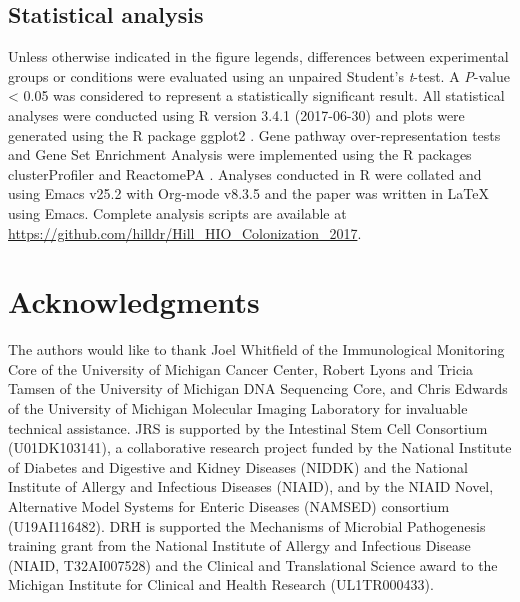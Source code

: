 \documentclass[9pt,lineo]{elife}
\begin{document}
\subsection*{{\bfseries\sffamily } Statistical analysis}
\label{sec:orgheadline24}
Unless otherwise indicated in the figure legends, differences between experimental groups or conditions were evaluated using an unpaired Student's \emph{t}-test. A \emph{P}-value < 0.05 was considered to represent a statistically significant result. All statistical analyses were conducted using R version 3.4.1 (2017-06-30) \citep{CRAN:2017} and plots were generated using the R package ggplot2 \citep{Wickham:2009}. Gene pathway over-representation tests and Gene Set Enrichment Analysis \citep{Subramanian:2005} were implemented using the R packages clusterProfiler \citep{Yu:2012} and ReactomePA \citep{Yu:2016}. Analyses conducted in R were collated and using Emacs v25.2 \citep{Stallman:1981:EEC:1159890.806466} with Org-mode v8.3.5 and the paper was written in \LaTeX{} using Emacs. Complete analysis scripts are available at \url{https://github.com/hilldr/Hill_HIO_Colonization_2017}.
\section*{{\bfseries\sffamily } Acknowledgments}
\label{sec:orgheadline26}
The authors would like to thank Joel Whitfield of the Immunological Monitoring Core of the University of Michigan Cancer Center, Robert Lyons and Tricia Tamsen of the University of Michigan DNA Sequencing Core, and Chris Edwards of the University of Michigan Molecular Imaging Laboratory for invaluable technical assistance.
JRS is supported by the Intestinal Stem Cell Consortium (U01DK103141), a collaborative research project funded by the National Institute of Diabetes and Digestive and Kidney Diseases (NIDDK) and the National Institute of Allergy and Infectious Diseases (NIAID), and by the NIAID Novel, Alternative Model Systems for Enteric Diseases (NAMSED) consortium (U19AI116482). DRH is supported the Mechanisms of Microbial Pathogenesis training grant from the National Institute of Allergy and Infectious Disease (NIAID, T32AI007528) and the Clinical and Translational Science award to the Michigan Institute for Clinical and Health Research (UL1TR000433). 

\nocite{*}
\end{document}

